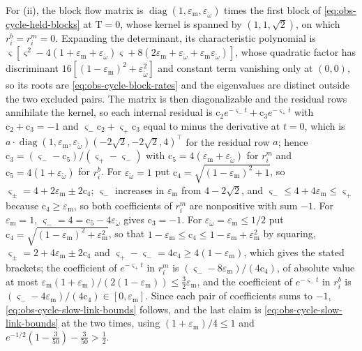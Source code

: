 For (ii), the block flow matrix is $\operatorname{diag}(1,\varepsilon_{\mathrm m},\varepsilon_{\check\omega})$
times the first block of \eqref{eq:obs-cycle-held-blocks} at $\mathrm T=0$, whose
kernel is spanned by $(1,1,\sqrt2)$, on which $r^b_i=r^m_i=0$. Expanding the
determinant, its characteristic polynomial is
$\varsigma[\varsigma^2-4(1+\varepsilon_{\mathrm m}+\varepsilon_{\check\omega})\varsigma+8(2\varepsilon_{\mathrm m}+\varepsilon_{\check\omega}+\varepsilon_{\mathrm m}\varepsilon_{\check\omega})]$,
whose quadratic factor has discriminant
$16[(1-\varepsilon_{\mathrm m})^2+\varepsilon_{\check\omega}^2]$ and constant term vanishing
only at $(0,0)$, so its roots are \eqref{eq:obs-cycle-block-rates} and the
eigenvalues are distinct outside the two excluded pairs. The matrix is then
diagonalizable and the residual rows annihilate the kernel, so each internal residual
is $\mathrm c_2e^{-\varsigma_-t}+\mathrm c_3e^{-\varsigma_+t}$ with
$\mathrm c_2+\mathrm c_3=-1$ and $\varsigma_-\mathrm c_2+\varsigma_+\mathrm c_3$ equal
to minus the derivative at $t=0$, which is
$a\cdot\operatorname{diag}(1,\varepsilon_{\mathrm m},\varepsilon_{\check\omega})(-2\sqrt2,-2\sqrt2,4)^\top$
for the residual row $a$; hence $\mathrm c_3=(\varsigma_--\mathrm c_5)/(\varsigma_+-\varsigma_-)$
with $\mathrm c_5=4(\varepsilon_{\mathrm m}+\varepsilon_{\check\omega})$ for $r^m_i$ and
$\mathrm c_5=4(1+\varepsilon_{\check\omega})$ for $r^b_i$. For $\varepsilon_{\check\omega}=1$ put
$\mathrm c_4=\sqrt{(1-\varepsilon_{\mathrm m})^2+1}$, so
$\varsigma_\pm=4+2\varepsilon_{\mathrm m}\pm2\mathrm c_4$; $\varsigma_-$ increases in
$\varepsilon_{\mathrm m}$ from $4-2\sqrt2$, and
$\varsigma_-\le4+4\varepsilon_{\mathrm m}\le\varsigma_+$ because
$\mathrm c_4\ge\varepsilon_{\mathrm m}$, so both coefficients of $r^m_i$ are
nonpositive with sum $-1$. For $\varepsilon_{\mathrm m}=1$,
$\varsigma_-=4=\mathrm c_5-4\varepsilon_{\check\omega}$ gives $\mathrm c_3=-1$. For
$\varepsilon_{\check\omega}=\varepsilon_{\mathrm m}\le1/2$ put
$\mathrm c_4=\sqrt{(1-\varepsilon_{\mathrm m})^2+\varepsilon_{\mathrm m}^2}$, so that
$1-\varepsilon_{\mathrm m}\le\mathrm c_4\le1-\varepsilon_{\mathrm m}+\varepsilon_{\mathrm m}^2$
by squaring, $\varsigma_\pm=2+4\varepsilon_{\mathrm m}\pm2\mathrm c_4$ and
$\varsigma_+-\varsigma_-=4\mathrm c_4\ge4(1-\varepsilon_{\mathrm m})$, which gives the
stated brackets; the coefficient of $e^{-\varsigma_+t}$ in $r^m_i$ is
$(\varsigma_--8\varepsilon_{\mathrm m})/(4\mathrm c_4)$, of absolute value at most
$\varepsilon_{\mathrm m}(1+\varepsilon_{\mathrm m})/(2(1-\varepsilon_{\mathrm m}))\le\frac32\varepsilon_{\mathrm m}$,
and the coefficient of $e^{-\varsigma_-t}$ in $r^b_i$ is
$(\varsigma_--4\varepsilon_{\mathrm m})/(4\mathrm c_4)\in[0,\varepsilon_{\mathrm m}]$.
Since each pair of coefficients sums to $-1$, \eqref{eq:obs-cycle-slow-link-bounds}
follows, and the last claim is \eqref{eq:obs-cycle-slow-link-bounds} at the two
times, using $(1+\varepsilon_{\mathrm m})/4\le1$ and
$e^{-1/2}(1-\frac3{50})-\frac3{50}>\frac12$.

